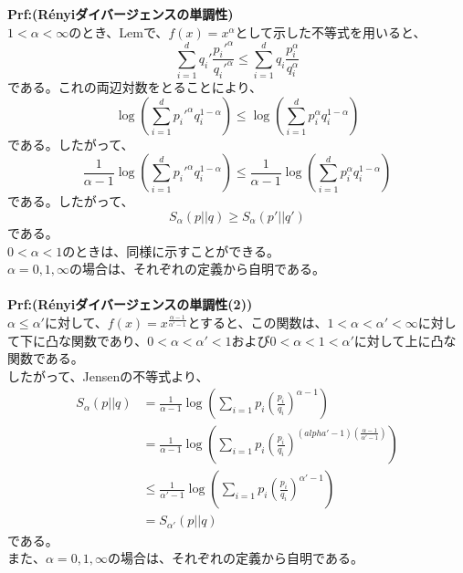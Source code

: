 \documentclass[a4paper,11pt]{jsarticle}
\numberwithin{equation}{section}
\begin{document}
\textbf{Prf:(Rényiダイバージェンスの単調性)}\\
$1<\alpha <\infty$のとき、Lemで、$f(x) = x^{\alpha}$として示した不等式を用いると、
\begin{equation}
    \sum_{i=1}^{d}q_i'\frac{p_i'^{\alpha}}{q_i'^{\alpha}} \leq \sum_{i=1}^{d}q_i\frac{p_i^{\alpha}}{q_i^{\alpha}}
\end{equation}
である。これの両辺対数をとることにより、
\begin{equation}
    \log(\sum_{i=1}^{d}p_i'^{\alpha}q_i^{1-\alpha}) \leq \log(\sum_{i=1}^{d}p_i^{\alpha}q_i^{1-\alpha})
\end{equation}
である。したがって、
\begin{equation}
    \frac{1}{\alpha - 1}\log(\sum_{i=1}^{d}p_i'^{\alpha}q_i^{1-\alpha}) \leq \frac{1}{\alpha - 1}\log(\sum_{i=1}^{d}p_i^{\alpha}q_i^{1-\alpha})
\end{equation}
である。したがって、
\begin{equation}
    S_{\alpha}(p||q) \geq S_{\alpha}(p'||q')
\end{equation}
である。\\
$0<\alpha <1$のときは、同様に示すことができる。\\
$\alpha =0,1,\infty$の場合は、それぞれの定義から自明である。\\
\hfill \qedsymbol\\

\textbf{Prf:(Rényiダイバージェンスの単調性(2))}\\
$\alpha \leq \alpha'$に対して、$f(x) =x^{\frac{\alpha-1}{\alpha'-1}}$とすると、この関数は、$1<\alpha <\alpha'<\infty$に対して下に凸な関数であり、$0<\alpha<\alpha'<1$および$0<\alpha<1<\alpha'$に対して上に凸な関数である。\\
したがって、Jensenの不等式より、
\begin{align}
    S_{\alpha}(p||q) &= \frac{1}{\alpha - 1}\log(\sum_{i=1} p_i\left(\frac{p_i}{q_i}\right)^{\alpha-1})\\
    &= \frac{1}{\alpha - 1}\log(\sum_{i=1} p_i\left(\frac{p_i}{q_i}\right)^{(alpha'-1)(\frac{\alpha-1}{\alpha'-1})})\\
    &\leq \frac{1}{\alpha' - 1}\log(\sum_{i=1} p_i\left(\frac{p_i}{q_i}\right)^{\alpha'-1})\\
    &= S_{\alpha'}(p||q)
\end{align}
である。\\
また、$\alpha=0,1,\infty$の場合は、それぞれの定義から自明である。\\
\hfill \qedsymbol\\
\end{document}
